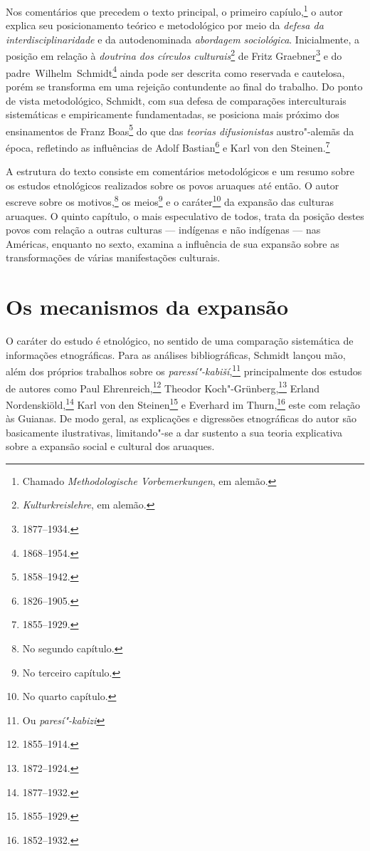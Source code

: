 Nos comentários que precedem o texto principal, o primeiro capíulo,\footnote{Chamado \textit{Methodologische Vorbemerkungen}, em alemão.} o autor explica seu posicionamento teórico e metodológico por meio da \emph{defesa da interdisciplinaridade} e da autodenominada \emph{abordagem sociológica}. Inicialmente, a posição em relação à \textit{doutrina dos círculos culturais}\footnote{\textit{Kulturkreislehre}, em alemão.} de Fritz Graebner\footnote{1877--1934.} e do padre~Wilhelm~Schmidt\footnote{1868--1954.} ainda pode ser descrita como reservada e cautelosa, porém se transforma em uma rejeição contundente ao final do trabalho. Do ponto de vista metodológico, Schmidt, com sua defesa de comparações interculturais sistemáticas e empiricamente fundamentadas, se posiciona mais próximo dos ensinamentos de Franz Boas\footnote{1858--1942.} do que das \textit{teorias difusionistas} austro"-alemãs da época, refletindo as influências de Adolf Bastian\footnote{1826--1905.} e Karl von den Steinen.\footnote{1855--1929.}

A estrutura do texto consiste em comentários metodológicos e um resumo sobre os estudos etnológicos realizados sobre os povos aruaques até então. O autor escreve sobre os motivos,\footnote{No segundo capítulo.} os meios\footnote{No terceiro capítulo.} e o caráter\footnote{No quarto capítulo.} da expansão das culturas aruaques. O quinto capítulo, o mais especulativo de todos, trata da posição destes povos com relação a outras culturas --- indígenas e não indígenas --- nas Américas, enquanto no sexto, examina a influência de sua expansão sobre as transformações de várias manifestações culturais. 

\section{Os mecanismos da expansão}

O caráter do estudo é etnológico, no sentido de uma comparação sistemática de informações etnográficas. Para as análises bibliográficas, Schmidt lançou mão, além dos próprios trabalhos sobre os \textit{paressí"-kabiší},\footnote{Ou \textit{paresí"-kabizi}} principalmente dos estudos de autores como Paul Ehrenreich,\footnote{1855--1914.} Theodor Koch"-Grünberg,\footnote{1872--1924.} Erland Nordenskiöld,\footnote{1877--1932.} Karl von den Steinen\footnote{1855--1929.} e Everhard im Thurn,\footnote{1852--1932.} este com relação às Guianas. De modo geral, as explicações e digressões etnográficas do autor são basicamente ilustrativas, limitando"-se a dar sustento a sua teoria explicativa sobre a expansão social e cultural dos aruaques.

